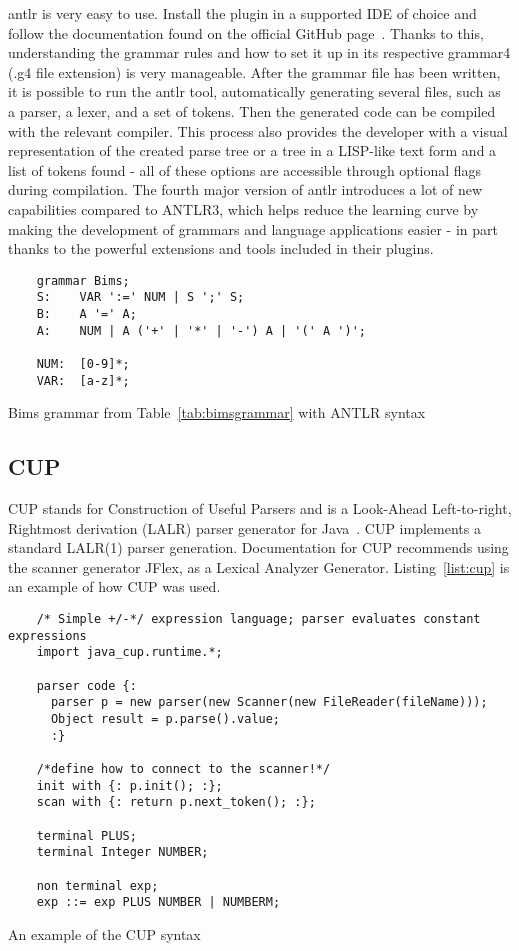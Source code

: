 \gls{antlr} is very easy to use. Install the plugin in a supported IDE of choice and follow the documentation found on the official GitHub page~\cite{ANTLR_Documentation}. Thanks to this, understanding the grammar rules and how to set it up in its respective grammar4 (.g4 file extension) is very manageable. After the grammar file has been written, it is possible to run the \gls{antlr} tool, automatically generating several files, such as a parser, a lexer, and a set of tokens. Then the generated code can be compiled with the relevant compiler. This process also provides the developer with a visual representation of the created parse tree or a tree in a LISP-like text form and a list of tokens found - all of these options are accessible through optional flags during compilation. The fourth major version of \gls{antlr} introduces a lot of new capabilities compared to ANTLR3, which helps reduce the learning curve by making the development of grammars and language applications easier - in part thanks to the powerful extensions and tools included in their plugins.


\begin{listing}[htb!]
  \begin{verbatim}
    grammar Bims;
    S:    VAR ':=' NUM | S ';' S;
    B:    A '=' A;
    A:    NUM | A ('+' | '*' | '-') A | '(' A ')';
    
    NUM:  [0-9]*;
    VAR:  [a-z]*;
  \end{verbatim}
  \caption{Bims grammar from Table~\ref{tab:bimsgrammar} with ANTLR syntax}
  \label{tab:antlrexample}
\end{listing}


\subsection{CUP}
CUP stands for Construction of Useful Parsers and is a Look-Ahead Left-to-right, Rightmost derivation (LALR) parser generator for Java~\cite{cupParserGenerator}. CUP implements a standard LALR(1) parser generation. Documentation for CUP recommends using the scanner generator JFlex, as a Lexical Analyzer Generator. Listing~\ref{list:cup} is an example of how CUP was used.


\begin{listing}[htb!]
  \centering
  \begin{verbatim}
    /* Simple +/-*/ expression language; parser evaluates constant expressions
    import java_cup.runtime.*;

    parser code {:
      parser p = new parser(new Scanner(new FileReader(fileName)));
      Object result = p.parse().value;  
      :}

    /*define how to connect to the scanner!*/
    init with {: p.init(); :};
    scan with {: return p.next_token(); :};

    terminal PLUS;
    terminal Integer NUMBER;

    non terminal exp;
    exp ::= exp PLUS NUMBER | NUMBERM;
  \end{verbatim}
  \caption{An example of the CUP syntax}
  \label{list:cup}
\end{listing}


